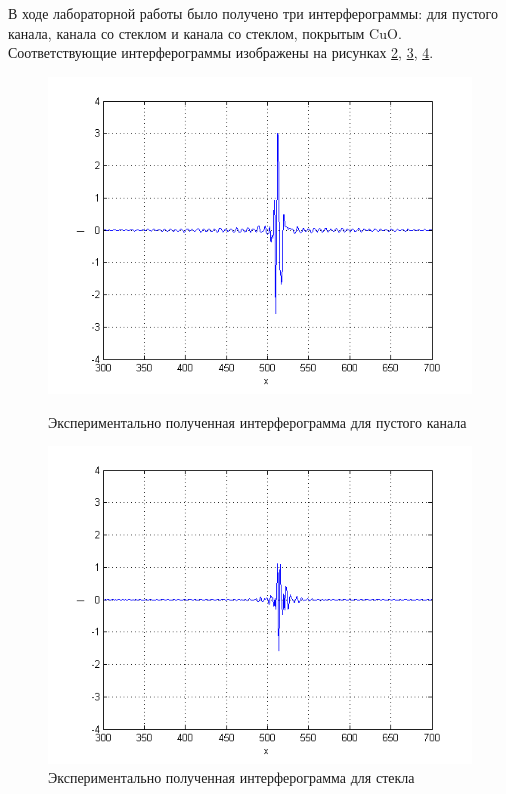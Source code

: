\documentclass[a4paper,12pt]{article} %
\begin{document}
    В ходе лабораторной работы было получено три интерферограммы: 
    для пустого канала, канала со стеклом и канала со стеклом, покрытым CuO. 
    Соответствующие интерферограммы изображены на рисунках \hyperref[picture_2]{2}, \hyperref[picture_3]{3}, \hyperref[picture_4]{4}.

    \begin{figure}[h!]
        \begin{center}
            \begin{minipage}[h!]{0.4\linewidth}
                \includegraphics[width=1.2\linewidth]{2.png}
                \caption{Экспериментально полученная интерферограмма для пустого канала}
                \label{picture_2}
            \end{minipage}
            \hfill
            \begin{minipage}[h!]{0.4\linewidth}
                \includegraphics[width=1.2\linewidth]{3.png}
                \caption{Экспериментально полученная интерферограмма для стекла}
                \label{picture_3}
            \end{minipage}
        \end{center}
    \end{figure}
\end{document}
